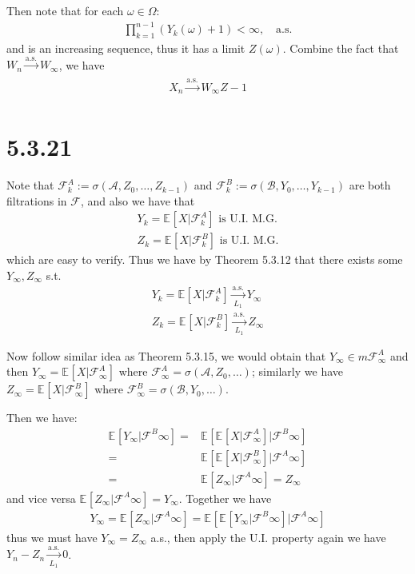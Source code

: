\documentclass[11pt,a4paper]{ctexart}
\numberwithin{equation}{section}%
\newcommand{\F}{\mathcal{F}}
\begin{document}
Then note that for each $ \omega \in \Omega $: 
\begin{align*}
    \prod_{k=1}^{n-1}(Y_k(\omega )+1) <\infty,\quad \text{a.s.}
\end{align*}
and is an increasing sequence, thus it has a limit $ Z(\omega ) $. Combine the fact that $ W_n \xrightarrow[]{\mathrm{a.s.}} W_\infty $, we have
\begin{align*}
    X_n \xrightarrow[]{\mathrm{a.s.}}  W_\infty Z -1
\end{align*}




\section{5.3.21}

Note that $ \F^A_k:=\sigma (\mathcal{A},Z_0,\ldots,Z_{k-1}) $ and $ \F^B_k:=\sigma (\mathcal{B},Y_0,\ldots,Y_{k-1}) $ are both filtrations in $ \F $, and also we have that
\begin{align*}
    Y_k = \mathbb{E}_{  }\left[ X| \F^A_k \right]\text{ is U.I. M.G.}\\
    Z_k = \mathbb{E}_{  }\left[ X| \F^B_k \right]\text{ is U.I. M.G.}  
\end{align*}
which are easy to verify. Thus we have by Theorem 5.3.12 that there exists some $ Y_\infty, Z_\infty $ s.t.
\begin{align*}
    Y_k = \mathbb{E}_{  }\left[ X| \F^A_k \right] \xrightarrow[L_1]{\mathrm{a.s.}} Y_\infty\\ 
    Z_k = \mathbb{E}_{  }\left[ X| \F^B_k \right] \xrightarrow[L_1]{\mathrm{a.s.}} Z_\infty
\end{align*}

Now follow similar idea as Theorem 5.3.15, we would obtain that $ Y_\infty \in m\F^A_\infty $ and then $ Y_\infty = \mathbb{E}_{  }\left[ X|\F^A_\infty \right]  $ where $ \F^A_\infty = \sigma (\mathcal{A}, Z_0,\ldots) $; similarly we have $ Z_\infty = \mathbb{E}_{  }\left[ X|\F^B_\infty \right]  $ where $ \F^B_\infty = \sigma (\mathcal{B}, Y_0,\ldots) $.

Then we have:
\begin{align*}
    \mathbb{E}_{  }\left[ Y_\infty | \F^B\infty \right] =& \mathbb{E}_{  }\left[ \mathbb{E}_{  }\left[ X|\F^A_\infty \right] |\F^B\infty  \right] \\
    =& \mathbb{E}_{  }\left[ \mathbb{E}_{  }\left[ X|\F^B_\infty \right] |\F^A\infty  \right]\\
    =& \mathbb{E}_{  }\left[ Z_\infty | \F^A\infty \right] = Z_\infty
\end{align*}
and vice versa $ \mathbb{E}_{  }\left[ Z_\infty | \F^A\infty \right] = Y_\infty $. Together we have
\begin{align*}
    Y_\infty = \mathbb{E}_{  }\left[ Z_\infty | \F^A\infty \right]=\mathbb{E}_{  }\left[ \mathbb{E}_{  }\left[ Y_\infty | \F^B\infty \right] | \F^A\infty \right]
\end{align*}
thus we must have $ Y_\infty = Z_\infty $ a.s., then apply the U.I. property again we have $ Y_n-Z_n \xrightarrow[L_1]{\mathrm{a.s.}} 0 $.
\end{document}
